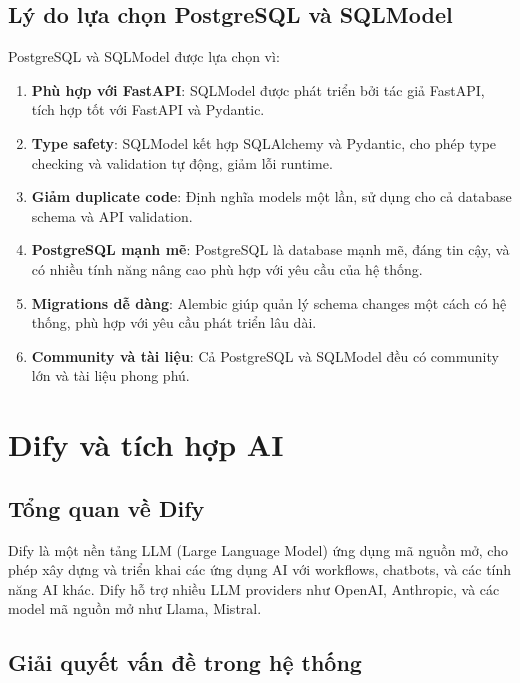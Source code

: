 \documentclass[../DoAn.tex]{subfiles}
\begin{document}
\subsection{Lý do lựa chọn PostgreSQL và SQLModel}

PostgreSQL và SQLModel được lựa chọn vì:

\begin{enumerate}
    \item \textbf{Phù hợp với FastAPI}: SQLModel được phát triển bởi tác giả FastAPI, tích hợp tốt với FastAPI và Pydantic.
    
    \item \textbf{Type safety}: SQLModel kết hợp SQLAlchemy và Pydantic, cho phép type checking và validation tự động, giảm lỗi runtime.
    
    \item \textbf{Giảm duplicate code}: Định nghĩa models một lần, sử dụng cho cả database schema và API validation.
    
    \item \textbf{PostgreSQL mạnh mẽ}: PostgreSQL là database mạnh mẽ, đáng tin cậy, và có nhiều tính năng nâng cao phù hợp với yêu cầu của hệ thống.
    
    \item \textbf{Migrations dễ dàng}: Alembic giúp quản lý schema changes một cách có hệ thống, phù hợp với yêu cầu phát triển lâu dài.
    
    \item \textbf{Community và tài liệu}: Cả PostgreSQL và SQLModel đều có community lớn và tài liệu phong phú.
\end{enumerate}

\section{Dify và tích hợp AI}
\label{section:3.5}

\subsection{Tổng quan về Dify}

Dify là một nền tảng LLM (Large Language Model) ứng dụng mã nguồn mở, cho phép xây dựng và triển khai các ứng dụng AI với workflows, chatbots, và các tính năng AI khác. Dify hỗ trợ nhiều LLM providers như OpenAI, Anthropic, và các model mã nguồn mở như Llama, Mistral.

\subsection{Giải quyết vấn đề trong hệ thống}
\end{document}
